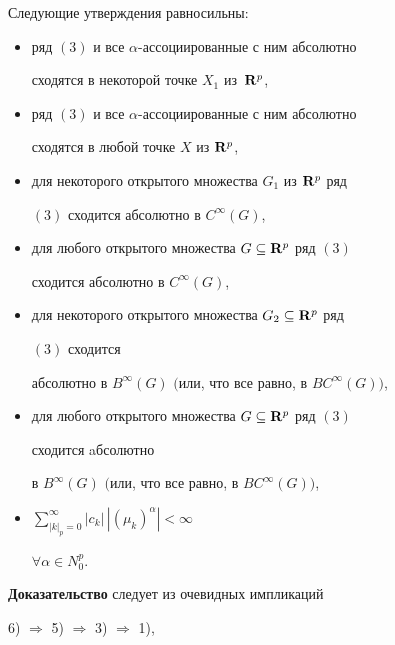 \begin{lem}


Следующие утверждения равносильны\/${:}$


\begin{itemize}


\item[1)] ряд $(3)$ и все $\alpha$-ассоциированные с ним абсолютно 


сходятся в некоторой точке $X_1$ из~${\bold R}^p$,


\item[2)] ряд $(3)$ и все $\alpha$-ассоциированные с ним абсолютно 


сходятся в любой точке $X$ из ${\bold R}^p$,


\item[3)] для некоторого открытого множества $G_1$ из ${\bold R}^p$ ряд 


$(3)$ сходится абсолютно в $C^{\infty}(G)$,


\item[4)] для любого открытого множества $G\subseteq {\bold R}^p$ ряд $(3)$


сходится абсолютно в $C^{\infty}(G)$,


\item[5)] для некоторого открытого множества $G_2\subseteq {\bold R}^p$ ряд


$(3)$ сходится


абсолютно в $B^{\infty}(G)$ $($или, что все равно, в $BC^{\infty}(G))$,


\item[6)] для любого открытого множества $G\subseteq {\bold R}^p$ ряд $(3)$


сходится aбсолютно


в $B^{\infty}(G)$ $($или, что все равно, в $BC^{\infty}(G))$,


\item[7)] 


$\sum\limits_{|k|_p=0}^{\infty}|c_k|\,|(\mu_k)^{\alpha}| <\infty$


$\forall\alpha\in N_0^p$.


\end{itemize}


\end{lem}





{\bf Доказательство} следует из очевидных импликаций


6) $\Rightarrow$ 5) $\Rightarrow$ 3) $\Rightarrow$ 1),


